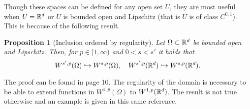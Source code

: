 \documentclass[12pt]{article}
\newtheorem{proposition}[theorem]{Proposition}
\theoremstyle{definition}
\begin{document}
Though these spaces can be defined for any open set $U$, they are most useful when $U=\mathbb{R}^d$ or $U$  is bounded open and Lipschitz (that is $U$ is of class $C^{0,1}$). This is because of the following result.
\begin{proposition}[Inclusion ordered by regularity]
	Let  $\Omega \subset \mathbb{R}^d$ be bounded open and Lipschitz. Then, for $p \in [1,\infty)$ and $0<s<s'$ it holds that
	\begin{align*}
		W^{s',p}(\Omega )\hookrightarrow W^{s,p}(\Omega ), \quad W^{s',p}(\mathbb{R}^d)\hookrightarrow W^{s,p}(\mathbb{R}^d).
	\end{align*}
\end{proposition}
The proof can be found in \cite{di2012hitchhiker's} page 10. The regularity of the domain is necessary to be able to extend functions in $W^{1,p}(\Omega )$ to $W^{1,p}(\mathbb{R}^d)$. The result is not true otherwise and an example is given in this same reference.
\end{document}

